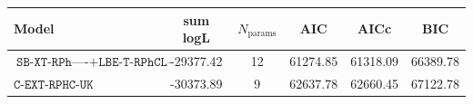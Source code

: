 \begin{tabular}{lccccc}
\toprule
Model & sum logL & $N_{\text{params}}$ & AIC & AICc & BIC \\
\midrule
$\texttt{SB-XT-RPh----}+\texttt{LBE-T-RPhCL--}$ & -29377.42 & 12 & 61274.85 & 61318.09 & 66389.78 \\
$\texttt{C-EXT-RPHC-UK}$ & -30373.89 & 9 & 62637.78 & 62660.45 & 67122.78 \\
\bottomrule
\end{tabular}
